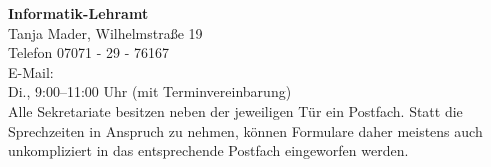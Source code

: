 \textbf{Informatik-Lehramt}\\
Tanja Mader, Wilhelmstraße 19\\
Telefon 07071 - 29 - 76167\\
E-Mail: \\
Di., 9:00--11:00 Uhr (mit Terminvereinbarung)\\

Alle Sekretariate besitzen neben der jeweiligen Tür ein Postfach. Statt die
Sprechzeiten in Anspruch zu nehmen, können Formulare daher meistens auch
unkompliziert in das entsprechende Postfach eingeworfen werden.\\

